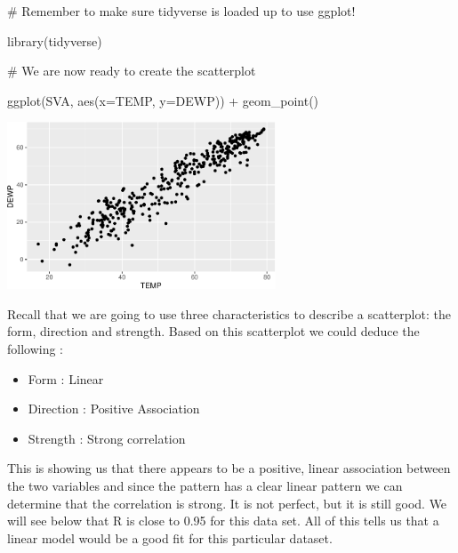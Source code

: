 \documentclass[
  letterpaper,
  DIV=11,
  numbers=noendperiod]{scrreprt}
\newenvironment{Shaded}{\begin{snugshade}}{\end{snugshade}}
\newcommand{\AttributeTok}[1]{\textcolor[rgb]{0.40,0.45,0.13}{#1}}
\newcommand{\CommentTok}[1]{\textcolor[rgb]{0.37,0.37,0.37}{#1}}
\newcommand{\FunctionTok}[1]{\textcolor[rgb]{0.28,0.35,0.67}{#1}}
\newcommand{\NormalTok}[1]{\textcolor[rgb]{0.00,0.23,0.31}{#1}}
\newcommand{\SpecialCharTok}[1]{\textcolor[rgb]{0.37,0.37,0.37}{#1}}
\providecommand{\tightlist}{%
  \setlength{\itemsep}{0pt}\setlength{\parskip}{0pt}}\usepackage{longtable,booktabs,array}
\begin{document}
\begin{Shaded}
\begin{Highlighting}[]
\CommentTok{\# Remember to make sure tidyverse is loaded up to use ggplot! }

\FunctionTok{library}\NormalTok{(tidyverse)}
\end{Highlighting}
\end{Shaded}

\begin{Shaded}
\begin{Highlighting}[]
\CommentTok{\# We are now ready to create the scatterplot}

\FunctionTok{ggplot}\NormalTok{(SVA, }\FunctionTok{aes}\NormalTok{(}\AttributeTok{x=}\NormalTok{TEMP, }\AttributeTok{y=}\NormalTok{DEWP)) }\SpecialCharTok{+}
  \FunctionTok{geom\_point}\NormalTok{()}
\end{Highlighting}
\end{Shaded}

\begin{center}
\includegraphics[width=0.6\textwidth,height=\textheight]{Linear_Modeling_and_Regression_files/figure-pdf/unnamed-chunk-4-1.pdf}
\end{center}

Recall that we are going to use three characteristics to describe a
scatterplot: the form, direction and strength. Based on this scatterplot
we could deduce the following :

\begin{itemize}
\tightlist
\item
  Form : Linear
\item
  Direction : Positive Association
\item
  Strength : Strong correlation
\end{itemize}

This is showing us that there appears to be a positive, linear
association between the two variables and since the pattern has a clear
linear pattern we can determine that the correlation is strong. It is
not perfect, but it is still good. We will see below that R is close to
0.95 for this data set. All of this tells us that a linear model would
be a good fit for this particular dataset.
\end{document}
